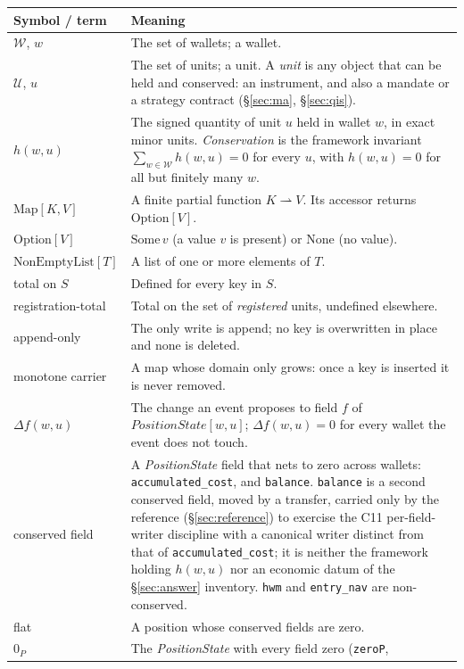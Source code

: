 \documentclass[11pt,a4paper]{article}
\begin{document}
\begin{longtable}{p{3.4cm}p{11.4cm}}
\toprule
\textbf{Symbol / term} & \textbf{Meaning} \\
\midrule
$\mathcal{W}$, $w$ & The set of wallets; a wallet. \\
$\mathcal{U}$, $u$ & The set of units; a unit. A \emph{unit} is any object that can be
held and conserved: an instrument, and also a mandate or a strategy contract
(\S\ref{sec:ma}, \S\ref{sec:qis}). \\
$h(w,u)$ & The signed quantity of unit $u$ held in wallet $w$, in exact minor units.
\emph{Conservation} is the framework invariant $\sum_{w\in\mathcal{W}} h(w,u)=0$ for every
$u$, with $h(w,u)=0$ for all but finitely many $w$. \\
\addlinespace
$\mathrm{Map}[K,V]$ & A finite partial function $K\rightharpoonup V$. Its accessor returns
$\mathrm{Option}[V]$. \\
$\mathrm{Option}[V]$ & $\mathrm{Some}\,v$ (a value $v$ is present) or $\mathrm{None}$ (no
value). \\
$\mathrm{NonEmptyList}[T]$ & A list of one or more elements of $T$. \\
total on $S$ & Defined for every key in $S$. \\
registration-total & Total on the set of \emph{registered} units, undefined elsewhere. \\
append-only & The only write is append; no key is overwritten in place and none is deleted. \\
monotone carrier & A map whose domain only grows: once a key is inserted it is never
removed. \\
\addlinespace
$\Delta f(w,u)$ & The change an event proposes to field $f$ of $\mathit{PositionState}[w,u]$;
$\Delta f(w,u)=0$ for every wallet the event does not touch. \\
conserved field & A \emph{PositionState} field that nets to zero across wallets:
\texttt{accumulated\_cost}, and \texttt{balance}. \texttt{balance} is a second conserved field,
moved by a transfer, carried only by the reference (\S\ref{sec:reference}) to exercise the C11
per-field-writer discipline with a canonical writer distinct from that of
\texttt{accumulated\_cost}; it is neither the framework holding $h(w,u)$ nor an economic datum
of the \S\ref{sec:answer} inventory. \texttt{hwm} and \texttt{entry\_nav} are non-conserved. \\
flat & A position whose conserved fields are zero. \\
$0_P$ & The \emph{PositionState} with every field zero (\texttt{zeroP},

\end{longtable}
\end{document}
